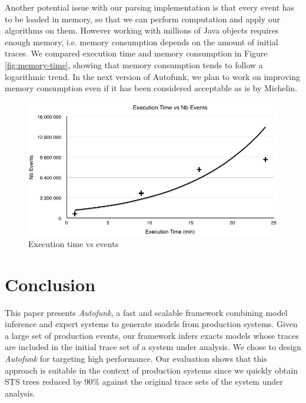 Another potential issue with our parsing implementation is that
every event has to be loaded in memory, so that we can perform
computation and apply our algorithms on them. However working
with millions of Java objects requires enough memory, i.e.
memory consumption depends on the amount of initial traces. We
compared execution time and memory consumption in Figure
\ref{fig:memory-time}, showing that memory consumption tends to
follow a logarithmic trend. In the next version of Autofunk, we
plan to work on improving memory consumption even if it has been
considered acceptable as is by Michelin.

\begin{figure}[H]
    \begin{center}
        \includegraphics[width=0.9\linewidth]{figures/time-vs-messages.png}
    \end{center}

    \caption{Execution time vs events}
    \label{fig:time-vs-messages}
\end{figure}


\section{Conclusion}
\label{ref:conclusion}

This paper presents \textit{Autofunk}, a fast and scalable
framework combining model inference and expert systems to
generate models from production systems. Given a large set of
production events, our framework infers exacts models whose
traces are included in the initial trace set of a system under
analysis. We chose to design \textit{Autofunk} for targeting high
performance. Our evaluation shows that this approach is suitable
in the context of production systems since we quickly obtain STS
trees reduced by 90\% against the original trace sets of the
system under analysis.
